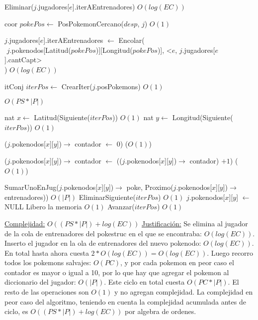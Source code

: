 \begin{Algoritmos}
\begin{algorithmic}[1]
$ $\newline

\State Eliminar($j$.jugadores[$e$].iterAEntrenadores) \Comment $O(log(EC))$

\State coor $pokePos \gets$ PosPokemonCercano($desp$, $j$) \Comment $O(1)$

\State $j$.jugadores[$e$].iterAEntrenadores $\gets$ Encolar(\\
$   $\hspace*{2cm}  $j$.pokenodos[Latitud($pokePos$)][Longitud($pokePos$)], <$e$, $j$.jugadores[$e$].cantCapt>\\
$   $\hspace*{1cm}) \Comment $O(log(EC))$


\State itConj $iterPos \gets$ CrearIter($j$.posPokemons) \Comment $O(1)$ 

 \Comment $O(PS * |P|)$

  \State nat $x \gets$ Latitud(Siguiente($iterPos$)) \Comment $O(1)$
  \State nat $y \gets$ Longitud(Siguiente($iterPos$)) \Comment $O(1)$   

    \State ($j$.pokenodos[$x$][$y$])$\rightarrow$ contador $\gets$ 0) \Comment($O(1)$)
  \EndIf

  
  \State ($j$.pokenodos[$x$][$y$])$\rightarrow$ contador $\gets$ (($j$.pokenodos[$x$][$y$])$\rightarrow$ contador) $+ 1$) \Comment($O(1)$)
  
    \State SumarUnoEnJug($j$.pokenodos[$x$][$y$])$\rightarrow$ poke, Proximo($j$.pokenodos[$x$][$y$])$\rightarrow$ entrenadores)) \Comment $O(|P|)$
    \State EliminarSiguiente($iterPos$) \Comment $O(1)$
    \State $j$.pokenodos[$x$][$y$] $\gets$ NULL \Comment Libero la memoria $O(1)$
  \Else 
    \State Avanzar($iterPos$) \Comment $O(1)$ 
  \EndIf

\EndWhile 



\medskip
\Statex \underline{Complejidad:} $O((PS *|P|) + log(EC))$ 
\Statex \underline{Justificaci\'on:} Se elimina al jugador de la cola de entrenadores del pokestruc en el que se encontraba: $O(log(EC))$. Inserto el jugador en la ola de entrenadores del nuevo pokenodo: $O(log(EC))$. En total hasta ahora cuesta $2*O(log(EC)) = O(log(EC))$. Luego recorro todos los pokemons salvajes: $O(PC)$, y por cada pokemon en peor caso el contador es mayor o igual a 10, por lo que hay que agregar el pokemon al diccionario del jugador: $O(|P|)$. Este ciclo en total cuesta $O(PC*|P|)$. El resto de las operaciones son $O(1)$ y no agregan complejidad. La complejidad en peor caso del algoritmo, teniendo en cuenta la complejidad acumulada antes de ciclo, es $O((PS *|P|) + log(EC))$ por algebra de ordenes.
\end{algorithmic}


\end{Algoritmos}
